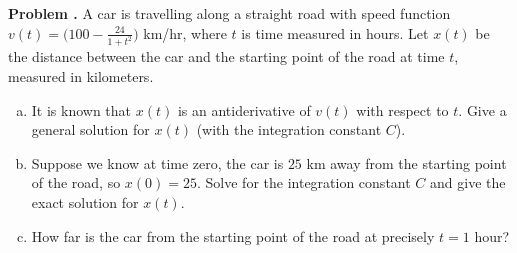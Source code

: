 \documentclass[11pt,letterpaper]{article}
\newcounter{problem}
\newcommand{\problem}{
	\stepcounter{problem}%
	\noindent \textbf{Problem \theproblem. }%
}
\begin{document}
\problem A car is travelling along a straight road with speed function $v(t) = \big(100 - \frac{24}{1+t^2}\big)$ km/hr, where $t$ is time measured in hours.  Let $x(t)$ be the distance between the car and the starting point of the road at time $t$, measured in kilometers.
    \begin{enumerate}[(a)]
        \item It is known that $x(t)$ is an antiderivative of $v(t)$ with respect to $t$.  Give a general solution for $x(t)$ (with the integration constant $C$).
        \item Suppose we know at time zero, the car is $25$ km away from the starting point of the road, so $x(0) = 25$.  Solve for the integration constant $C$ and give the exact solution for $x(t)$.
        \item How far is the car from the starting point of the road at precisely $t=1$ hour?
    \end{enumerate} \vspace{6mm}
\end{document}
